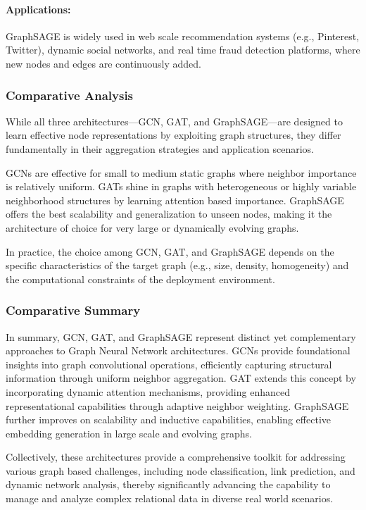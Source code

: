 \documentclass{article}
\begin{document}
\paragraph{Applications:}
GraphSAGE is widely used in web scale recommendation systems (e.g., Pinterest, Twitter), dynamic social networks, and real time fraud detection platforms, where new nodes and edges are continuously added.

\subsubsection{Comparative Analysis}

While all three architectures—GCN, GAT, and GraphSAGE—are designed to learn effective node representations by exploiting graph structures, they differ fundamentally in their aggregation strategies and application scenarios.

GCNs are effective for small to medium static graphs where neighbor importance is relatively uniform. GATs shine in graphs with heterogeneous or highly variable neighborhood structures by learning attention based importance. GraphSAGE offers the best scalability and generalization to unseen nodes, making it the architecture of choice for very large or dynamically evolving graphs.

In practice, the choice among GCN, GAT, and GraphSAGE depends on the specific characteristics of the target graph (e.g., size, density, homogeneity) and the computational constraints of the deployment environment.



\subsubsection{Comparative Summary}

In summary, GCN, GAT, and GraphSAGE represent distinct yet complementary approaches to Graph Neural Network architectures. GCNs provide foundational insights into graph convolutional operations, efficiently capturing structural information through uniform neighbor aggregation. GAT extends this concept by incorporating dynamic attention mechanisms, providing enhanced representational capabilities through adaptive neighbor weighting. GraphSAGE further improves on scalability and inductive capabilities, enabling effective embedding generation in large scale and evolving graphs.

Collectively, these architectures provide a comprehensive toolkit for addressing various graph based challenges, including node classification, link prediction, and dynamic network analysis, thereby significantly advancing the capability to manage and analyze complex relational data in diverse real world scenarios.
\end{document}
